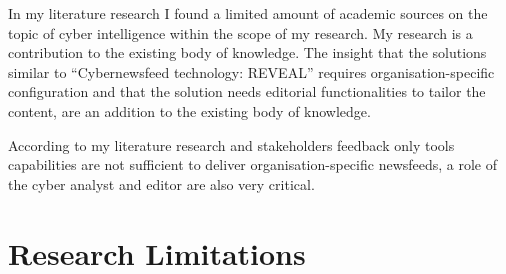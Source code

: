 


In my literature research I found a limited amount of
academic sources on the topic of cyber intelligence 
within the scope of my research.
My research is a contribution to the existing body of knowledge.
The insight that the solutions similar to \enquote{Cybernewsfeed technology: REVEAL}
requires organisation-specific configuration and that the solution
needs editorial functionalities to tailor the content,
are an addition 
to the existing body of knowledge.




According to my literature research and stakeholders feedback only tools capabilities are not sufficient to deliver organisation-specific newsfeeds, a role of the cyber analyst and editor are also very critical.





\section{Research Limitations}\label{Research Limitations}

